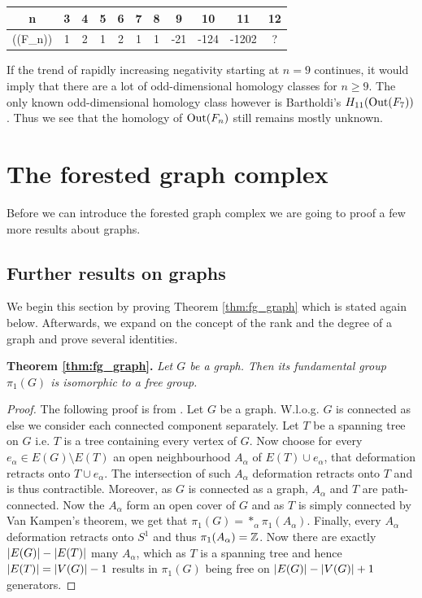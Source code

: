 \begin{table}[htpb]
	\centering
	\begin{tabular}{C|C|C|C|C|C|C|C|C|C|C}
		n & 3 & 4 & 5 & 6 & 7 & 8 & 9 & 10 & 11 & 12\\ \hline
		\chi(\out(F_{n})) & 1 & 2 & 1 & 2 & 1 & 1 & -21 & -124 & -1202 & ?
	\end{tabular}
\end{table}
If the trend of rapidly increasing negativity starting at $n=9$ continues, it would imply that there are a lot of odd-dimensional homology classes for $n \geq 9$.
The only known odd-dimensional homology class however is Bartholdi's $H_{11}(\operatorname{Out}(F_{7}))$.
Thus we see that the homology of $\operatorname{Out}(F_{n})$ still remains mostly unknown.

\newpage
\section{The forested graph complex}
Before we can introduce the forested graph complex we are going to proof a few more results about graphs.

\subsection{Further results on graphs}
\label{sec:RankGraph}
We begin this section by proving Theorem \ref{thm:fg_graph} which is stated again below.
Afterwards, we expand on the concept of the rank and the degree of a graph and prove several identities.

\textbf{Theorem \ref{thm:fg_graph}.} \textit{Let $G$ be a graph. Then its fundamental group $\pi_{1}(G)$ is isomorphic to a free group.}

\begin{proof}
	The following proof is from \cite[p. 43f.]{hatcher00}.
	Let $G$ be a graph. W.l.o.g. $G$ is connected as else we consider each connected component separately. 
	Let $T$ be a spanning tree on $G$ i.e. $T$ is a tree containing every vertex of $G$.
	Now choose for every $e_{\alpha} \in E(G) \setminus E(T)$ an open neighbourhood $A_{\alpha}$ of $E(T) \cup e_{\alpha}$, that deformation retracts onto $T \cup e_{\alpha}$.
	The intersection of such $A_{\alpha}$ deformation retracts onto $T$ and is thus contractible. 
	Moreover, as $G$ is connected as a graph, $A_{\alpha}$ and $T$ are path-connected.
	Now the $A_{\alpha}$ form an open cover of $G$ and as $T$ is simply connected by Van Kampen's theorem, we get that $\pi_{1}(G) = *_{\alpha} \pi_{1}(A_{\alpha})$.
	Finally, every $A_{\alpha}$ deformation retracts onto $S^{1}$ and thus $\pi_{1}(A_{\alpha}) = \mathbb{Z}$. Now there are exactly $\abs{E(G)} - \abs{E(T)}$ many $A_{\alpha}$,
	which as $T$ is a spanning tree and hence $\abs{E(T)} = \abs{V(G)}-1$ results in $\pi_1(G)$ being free on $\abs{E(G)} - \abs{V(G)} + 1$ generators.
\end{proof}

